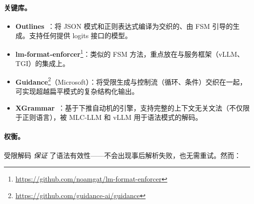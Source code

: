 \paragraph{关键库。}
\label{key-libraries.}

\begin{itemize}
  \item \textbf{Outlines}~\cite{willard2023outlines}：将 JSON 模式和正则表达式编译为交织的、由 FSM 引导的生成。支持任何提供 logits 接口的模型。
  \item \textbf{lm-format-enforcer}\footnote{\url{https://github.com/noamgat/lm-format-enforcer}}：类似的 FSM 方法，重点放在与服务框架（vLLM、TGI）的集成上。
  \item \textbf{Guidance}\footnote{\url{https://github.com/guidance-ai/guidance}}（Microsoft）：将受限生成与控制流（循环、条件）交织在一起，可实现超越扁平模式的复杂结构化输出。
  \item \textbf{XGrammar}~\cite{dong2024xgrammar}：基于下推自动机的引擎，支持完整的上下文无关文法（不仅限于正则语言），被 MLC-LLM 和 vLLM 用于语法模式的解码。
\end{itemize}

\paragraph{权衡。}
\label{trade-offs.}

受限解码 \emph{保证} 了语法有效性——不会出现事后解析失败，也无需重试。然而：

